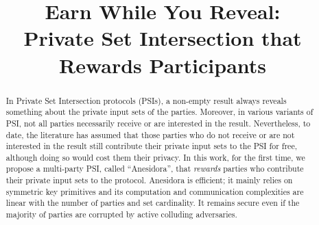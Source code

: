 \documentclass[runningheads]{llncs}
\newcommand{\withRew}{{Anesidora}\xspace}
\begin{document}
  \setlength\abovedisplayskip{0pt}
  \setlength\belowdisplayskip{0pt}


\newenvironment{packed_item}{
\begin{itemize}
	\setlength{\topsep}{0pt}
	\setlength{\partopsep}{0pt}
  \setlength{\itemsep}{0pt}
  \setlength{\parskip}{0pt}
  \setlength{\parsep}{0pt}
}{\end{itemize}}

\newenvironment{packed_enum}{
\begin{enumerate}
	\setlength{\topsep}{0pt}
	\setlength{\partopsep}{0pt}
  \setlength{\itemsep}{0pt}
  \setlength{\parskip}{0pt}
  \setlength{\parsep}{0pt}
}{\end{enumerate}}




\title{Earn While You Reveal: \\ Private Set Intersection that\\ Rewards Participants}
%



\author{}
\institute{}
\date{}
\maketitle{}


\begin{abstract}
In Private Set Intersection protocols (PSIs), a non-empty result always reveals something about the private input sets of the parties. Moreover, in various variants of PSI, not all parties necessarily receive or are interested in the result. Nevertheless, to date, the literature has assumed that those parties who do not receive or are not interested in the result still contribute their private input sets to the PSI for free, although doing so would cost them their privacy. In this work, for the first time, we propose a multi-party PSI, called ``\withRew'', that \emph{rewards} parties who contribute their private input sets to the protocol.  %
\withRew is efficient; it mainly relies on symmetric key primitives and its computation and communication complexities are linear with the number of parties and set cardinality. It remains secure even if the majority of parties are corrupted by active colluding adversaries.





\end{abstract}
 
 


\appendix








 
 
 
 


%
%
%
\end{document}
